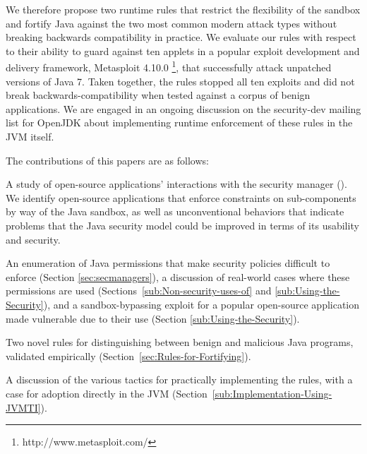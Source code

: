 \documentclass{sig-alternate}
\begin{document}
We therefore propose
two runtime rules that restrict the flexibility of the sandbox and fortify Java
against the two most common modern attack types without breaking backwards
compatibility in practice. We evaluate our rules
with respect to their ability to guard against ten applets in a popular exploit development
and delivery framework, Metasploit
4.10.0%
\footnote{http://www.metasploit.com/}, that successfully attack unpatched
versions of Java 7.
Taken together, the rules stopped all ten exploits and did not break
backwards-compatibility
when tested against a corpus of benign applications.
We are engaged in an
ongoing discussion on the security-dev mailing list for OpenJDK about
implementing runtime enforcement of these rules in the JVM itself.


The contributions of this papers are as follows:
\begin{flushitem} \setlength{\parskip}{0pt}
\setlength{\parsep}{0pt}
\setlength{\itemsep}{0pt}
\item A study of open-source applications' interactions with the security
manager ().  We identify open-source applications that 
enforce constraints on sub-components by way of the Java sandbox,
as well as unconventional behaviors that indicate problems that the Java
security model could be improved in terms of its usability and security. 
\item An enumeration of Java permissions that make security policies difficult
to enforce (Section \ref{sec:secmanagers}), a discussion of real-world cases
where these permissions are used (Sections~\ref{sub:Non-security-uses-of} and
\ref{sub:Using-the-Security}), and a sandbox-bypassing exploit for a popular
open-source application made vulnerable due to their use (Section
\ref{sub:Using-the-Security}).
\item Two novel rules for distinguishing between benign and malicious Java
programs, validated empirically (Section~\ref{sec:Rules-for-Fortifying}).
\item A discussion of the various tactics for practically implementing the
rules, with a case for adoption directly in the JVM (Section~\ref{sub:Implementation-Using-JVMTI}).
\end{flushitem}
\end{document}
